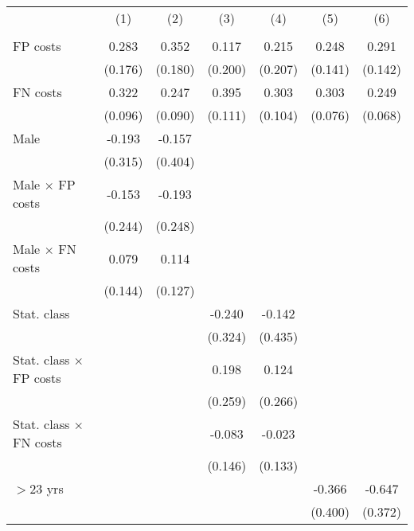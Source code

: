 \begin{tabular}{l*{6}{c}}
\hline\hline
                &\multicolumn{1}{c}{(1)}&\multicolumn{1}{c}{(2)}&\multicolumn{1}{c}{(3)}&\multicolumn{1}{c}{(4)}&\multicolumn{1}{c}{(5)}&\multicolumn{1}{c}{(6)}\\
                &\multicolumn{1}{c}{}&\multicolumn{1}{c}{}&\multicolumn{1}{c}{}&\multicolumn{1}{c}{}&\multicolumn{1}{c}{}&\multicolumn{1}{c}{}\\
\hline
FP costs        &    0.283&    0.352&    0.117&    0.215&    0.248&    0.291\\
                &  (0.176)&  (0.180)&  (0.200)&  (0.207)&  (0.141)&  (0.142)\\
FN costs        &    0.322&    0.247&    0.395&    0.303&    0.303&    0.249\\
                &  (0.096)&  (0.090)&  (0.111)&  (0.104)&  (0.076)&  (0.068)\\
Male            &   -0.193&   -0.157&         &         &         &         \\
                &  (0.315)&  (0.404)&         &         &         &         \\
Male $\times$ FP costs&   -0.153&   -0.193&         &         &         &         \\
                &  (0.244)&  (0.248)&         &         &         &         \\
Male $\times$ FN costs&    0.079&    0.114&         &         &         &         \\
                &  (0.144)&  (0.127)&         &         &         &         \\
Stat. class     &         &         &   -0.240&   -0.142&         &         \\
                &         &         &  (0.324)&  (0.435)&         &         \\
Stat. class $\times$ FP costs&         &         &    0.198&    0.124&         &         \\
                &         &         &  (0.259)&  (0.266)&         &         \\
Stat. class $\times$ FN costs&         &         &   -0.083&   -0.023&         &         \\
                &         &         &  (0.146)&  (0.133)&         &         \\
$>$23 yrs       &         &         &         &         &   -0.366&   -0.647\\
                &         &         &         &         &  (0.400)&  (0.372)\\

\end{tabular}
